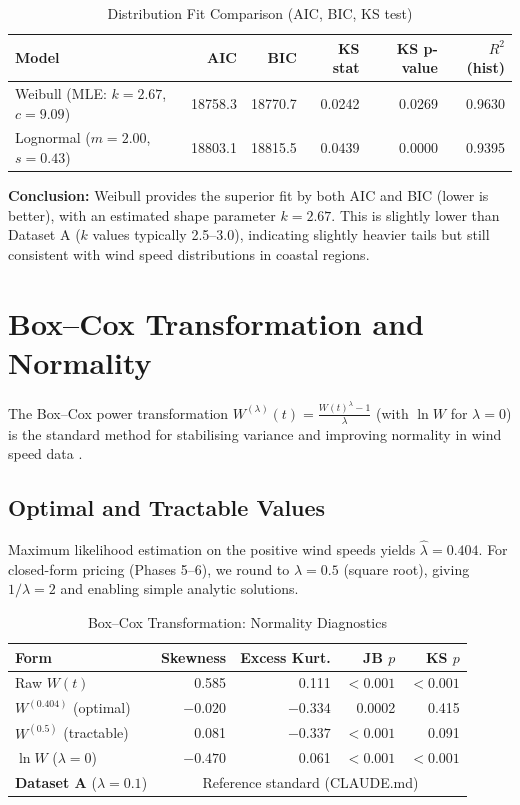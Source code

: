 \documentclass[11pt]{article}
\begin{document}
\begin{table}[h]
\centering
\caption{Distribution Fit Comparison (AIC, BIC, KS test)}
\label{tab:distfit}
\begin{tabular}{lrrrrr}
\toprule
\textbf{Model} & \textbf{AIC} & \textbf{BIC} & \textbf{KS stat} & \textbf{KS p-value} & \textbf{$R^2$ (hist)} \\
\midrule
Weibull (MLE: $k=2.67$, $c=9.09$) & 18758.3 & 18770.7 & 0.0242 & 0.0269 & 0.9630 \\
Lognormal ($m=2.00$, $s=0.43$) & 18803.1 & 18815.5 & 0.0439 & 0.0000 & 0.9395 \\
\bottomrule
\end{tabular}
\end{table}

\textbf{Conclusion:} Weibull provides the superior fit by both AIC and BIC (lower is better), with an estimated shape parameter $k = 2.67$. This is slightly lower than Dataset A ($k$ values typically 2.5--3.0), indicating slightly heavier tails but still consistent with wind speed distributions in coastal regions.

\section{Box--Cox Transformation and Normality}

The Box--Cox power transformation $W^{(\lambda)}(t) = \frac{W(t)^{\lambda} - 1}{\lambda}$ (with $\ln W$ for $\lambda=0$) is the standard method for stabilising variance and improving normality in wind speed data \citep{SaltyteBenth2009}.

\subsection{Optimal and Tractable Values}

Maximum likelihood estimation on the positive wind speeds yields $\hat{\lambda} = 0.404$. For closed-form pricing (Phases 5--6), we round to $\lambda = 0.5$ (square root), giving $1/\lambda = 2$ and enabling simple analytic solutions.

\begin{table}[h]
\centering
\caption{Box--Cox Transformation: Normality Diagnostics}
\label{tab:boxcox}
\begin{tabular}{lrrrr}
\toprule
\textbf{Form} & \textbf{Skewness} & \textbf{Excess Kurt.} & \textbf{JB $p$} & \textbf{KS $p$} \\
\midrule
Raw $W(t)$ & 0.585 & 0.111 & $<0.001$ & $<0.001$ \\
$W^{(0.404)}$ (optimal) & $-0.020$ & $-0.334$ & 0.0002 & 0.415 \\
$W^{(0.5)}$ (tractable) & 0.081 & $-0.337$ & $<0.001$ & 0.091 \\
$\ln W$ ($\lambda=0$) & $-0.470$ & 0.061 & $<0.001$ & $<0.001$ \\
\midrule
\textbf{Dataset A} ($\lambda=0.1$) & \multicolumn{4}{c}{Reference standard (CLAUDE.md)} \\
\bottomrule
\end{tabular}
\end{table}
\end{document}
